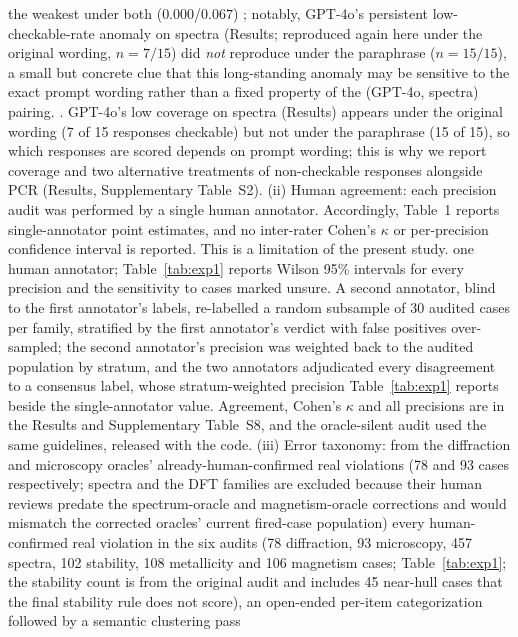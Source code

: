 \documentclass[pdflatex,sn-nature]{sn-jnl}
\newcommand{\rev}[1]{#1} %
\newcommand{\rev}[1]{{\color{blue}#1}} %
\providecommand{\DIFadd}[1]{{\protect\color{blue} \sf #1}} %
\providecommand{\DIFdel}[1]{{\protect\color{red} \scriptsize #1}} %
\providecommand{\DIFaddbegin}{} %
\providecommand{\DIFaddend}{} %
\providecommand{\DIFdelbegin}{} %
\providecommand{\DIFdelend}{} %
\providecommand{\DIFscaledelfig}{0.5}
\newlength{\DIFdelgraphicswidth} %
\newlength{\DIFdelgraphicsheight} %
\providecommand{\DIFaddincludegraphics}[2][]{{\color{blue}\fbox{\DIFOincludegraphics[#1]{#2}}}} %
\providecommand{\DIFdelincludegraphics}[2][]{%
\sbox{\DIFdelgraphicsbox}{\DIFOincludegraphics[#1]{#2}}%
\settoboxwidth{\DIFdelgraphicswidth}{\DIFdelgraphicsbox} %
\settoboxtotalheight{\DIFdelgraphicsheight}{\DIFdelgraphicsbox} %
\scalebox{\DIFscaledelfig}{%
\parbox[b]{\DIFdelgraphicswidth}{\usebox{\DIFdelgraphicsbox}\\[-\baselineskip] \rule{\DIFdelgraphicswidth}{0em}}\llap{\resizebox{\DIFdelgraphicswidth}{\DIFdelgraphicsheight}{%
\setlength{\unitlength}{\DIFdelgraphicswidth}%
\begin{picture}(1,1)%
\thicklines\linethickness{2pt} %
{\color[rgb]{1,0,0}\put(0,0){\framebox(1,1){}}}%
{\color[rgb]{1,0,0}\put(0,0){\line( 1,1){1}}}%
{\color[rgb]{1,0,0}\put(0,1){\line(1,-1){1}}}%
\end{picture}%
}\hspace*{3pt}}} %
} %
\DeclareRobustCommand{\DIFaddbegin}{\DIFOaddbegin \let\includegraphics\DIFaddincludegraphics} %
\DeclareRobustCommand{\DIFaddend}{\DIFOaddend \let\includegraphics\DIFOincludegraphics} %
\DeclareRobustCommand{\DIFdelbegin}{\DIFOdelbegin \let\includegraphics\DIFdelincludegraphics} %
\DeclareRobustCommand{\DIFdelend}{\DIFOaddend \let\includegraphics\DIFOincludegraphics} %
\begin{document}
the weakest under both ($0.000$/$0.067$)\DIFdelbegin \DIFdel{; notably, GPT-4o's persistent low-checkable-rate
anomaly on spectra (Results; reproduced again here under the original wording, $n=7/15$) did
\emph{not} reproduce under the paraphrase ($n=15/15$), a small but concrete clue that this
long-standing anomaly may be sensitive to the exact prompt wording rather than a fixed
property of the (GPT-4o, spectra) pairing. }\DIFdelend \DIFaddbegin \DIFadd{. \rev{GPT-4o's low coverage on spectra (Results) appears under the
original wording (7 of 15 responses checkable) but not under the paraphrase (15 of 15), so which
responses are scored depends on prompt wording; this is why we report coverage and two alternative
treatments of non-checkable responses alongside PCR (Results, Supplementary Table~S2).} }\DIFaddend (ii) Human agreement: each precision audit was performed by \DIFdelbegin \DIFdel{a single human
annotator. Accordingly, Table~1 reports single-annotator point estimates, and no
inter-rater Cohen's $\kappa$ or per-precision confidence interval is reported.
This is a limitation of the present study. }\DIFdelend \DIFaddbegin \DIFadd{one human
annotator\rev{; Table~\ref{tab:exp1} reports Wilson 95\% intervals for every precision and the
sensitivity to cases marked unsure. A second annotator, blind to the first annotator's labels,
re-labelled a random subsample of 30 audited cases per family, stratified by the first annotator's
verdict with false positives over-sampled; the second annotator's precision was weighted back to the
audited population by stratum, and the two annotators adjudicated every disagreement to a consensus label,
whose stratum-weighted precision Table~\ref{tab:exp1} reports beside the single-annotator value. Agreement,
Cohen's $\kappa$ and all precisions are in the Results and Supplementary Table~S8, and the oracle-silent audit used the same guidelines, released with
the code.} }\DIFaddend (iii) Error taxonomy: from \DIFdelbegin \DIFdel{the diffraction and microscopy oracles'
already-human-confirmed real violations (78 and 93 cases respectively; spectra and the DFT
families are excluded because their human reviews predate the spectrum-oracle and
magnetism-oracle corrections and would mismatch the corrected oracles' current fired-case
population)}\DIFdelend \DIFaddbegin \DIFadd{\rev{every
human-confirmed real violation in the six audits (78 diffraction, 93 microscopy, 457 spectra,
102 stability, 108 metallicity and 106 magnetism cases; Table~\ref{tab:exp1}; the stability count is from the
original audit and includes 45 near-hull cases that the final stability rule does not score)}}\DIFaddend , an open-ended per-item categorization followed by a semantic clustering pass
\end{document}
